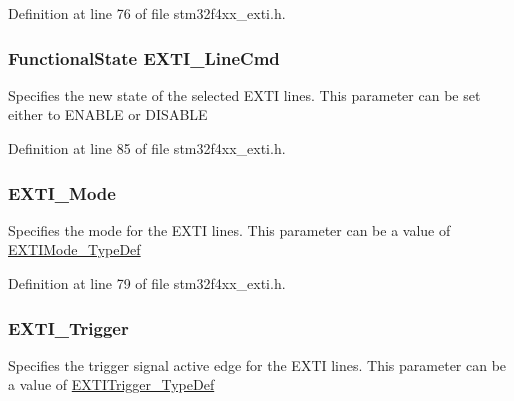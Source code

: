 Definition at line 76 of file stm32f4xx\-\_\-exti.\-h.

\hypertarget{struct_e_x_t_i___init_type_def_a5a4f12d56819fcfdd25f973adbbca045}{
\subsubsection[{E\-X\-T\-I\-\_\-\-Line\-Cmd}]{\setlength{\rightskip}{0pt plus 5cm}Functional\-State E\-X\-T\-I\-\_\-\-Line\-Cmd}}\label{struct_e_x_t_i___init_type_def_a5a4f12d56819fcfdd25f973adbbca045}
Specifies the new state of the selected E\-X\-T\-I lines. This parameter can be set either to E\-N\-A\-B\-L\-E or D\-I\-S\-A\-B\-L\-E 

Definition at line 85 of file stm32f4xx\-\_\-exti.\-h.

\hypertarget{struct_e_x_t_i___init_type_def_abea50256cdb09a2a84fc8f104611b867}{
\subsubsection[{E\-X\-T\-I\-\_\-\-Mode}]{ E\-X\-T\-I\-\_\-\-Mode}}\label{struct_e_x_t_i___init_type_def_abea50256cdb09a2a84fc8f104611b867}
Specifies the mode for the E\-X\-T\-I lines. This parameter can be a value of \hyperlink{group___e_x_t_i_gad5e69af98dc0dfdf64417adc1cf57929}{E\-X\-T\-I\-Mode\-\_\-\-Type\-Def} 

Definition at line 79 of file stm32f4xx\-\_\-exti.\-h.

\hypertarget{struct_e_x_t_i___init_type_def_ab60cf7701e280ca910eff8c618590ec5}{
\subsubsection[{E\-X\-T\-I\-\_\-\-Trigger}]{ E\-X\-T\-I\-\_\-\-Trigger}}\label{struct_e_x_t_i___init_type_def_ab60cf7701e280ca910eff8c618590ec5}
Specifies the trigger signal active edge for the E\-X\-T\-I lines. This parameter can be a value of \hyperlink{group___e_x_t_i_ga9da190f5425d1b421a06bced8cc48e9b}{E\-X\-T\-I\-Trigger\-\_\-\-Type\-Def} 

